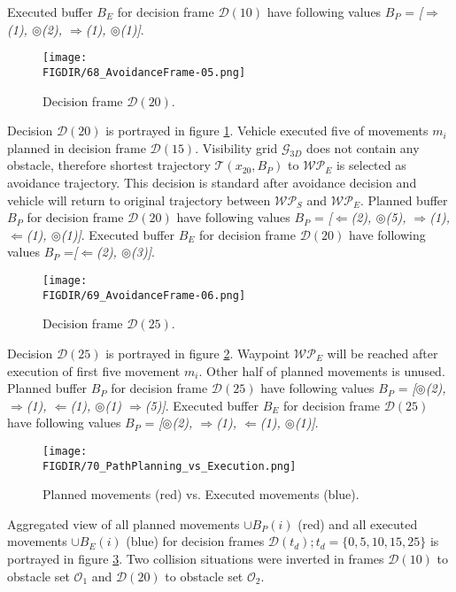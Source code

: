 Executed buffer $B_E$ for decision frame $\mathscr{D}(10)$ have following values $B_P$ = \textit{[$\Rightarrow$(1), $\circledcirc$(2), $\Rightarrow$(1), $\circledcirc$(1)]}.
\begin{figure}[H]
    \centering
    \texttt{[image: \\FIGDIR/68\_AvoidanceFrame-05.png]}
    \caption{Decision frame $\mathscr{D}(20)$.}
    \label{fig:decisionFrameSimple20}
\end{figure}
\noindent Decision $\mathscr{D}(20)$ is portrayed in figure \ref{fig:decisionFrameSimple20}. Vehicle executed five of movements $m_i$ planned in decision frame $\mathscr{D}(15)$. Visibility grid $\mathscr{G}_{3D}$ does not contain any obstacle, therefore shortest trajectory $\mathscr{T}(x_20,B_P)$ to $\mathscr{WP}_E$ is selected as avoidance trajectory. This decision is standard after avoidance decision and vehicle will return to original trajectory between $\mathscr{WP}_S$ and $\mathscr{WP}_E$.
Planned buffer $B_P$ for decision frame $\mathscr{D}(20)$ have following values $B_P$ = \textit{[$\Leftarrow$(2), $\circledcirc$(5), $\Rightarrow$(1), $\Leftarrow$(1), $\circledcirc$(1)]}.
Executed buffer $B_E$ for decision frame $\mathscr{D}(20)$ have following values $B_P$ =\textit{[$\Leftarrow$(2), $\circledcirc$(3)]}.
\begin{figure}[H]
    \centering
    \texttt{[image: \\FIGDIR/69\_AvoidanceFrame-06.png]}
    \caption{Decision frame $\mathscr{D}(25)$.}
    \label{fig:decisionFrameSimple25}
\end{figure}
\noindent Decision $\mathscr{D}(25)$ is portrayed in figure \ref{fig:decisionFrameSimple25}. Waypoint $\mathscr{WP}_E$ will be reached after execution of first five movement $m_i$. Other half of planned movements is unused.
Planned buffer $B_P$ for decision frame $\mathscr{D}(25)$ have following values $B_P$ =  \textit{[$\circledcirc$(2), $\Rightarrow$(1), $\Leftarrow$(1), $\circledcirc$(1) $\Rightarrow$(5)]}.
Executed buffer $B_E$ for decision frame $\mathscr{D}(25)$ have following values $B_P$ = \textit{[$\circledcirc$(2), $\Rightarrow$(1), $\Leftarrow$(1), $\circledcirc$(1)]}.
\begin{figure}[H]
    \centering
    \texttt{[image: \\FIGDIR/70\_PathPlanning\_vs\_Execution.png]}
    \caption{Planned movements (red) vs. Executed movements (blue).}
    \label{fig:planVSExecutionSimple}
\end{figure}
\noindent Aggregated view of all planned movements $\cup B_P(i)$ (red) and all executed movements $\cup B_E(i)$ (blue) for decision frames $\mathscr{D}(t_d);t_d=\{0,5,10,15,25\}$ is portrayed in figure \ref{fig:planVSExecutionSimple}. Two collision situations were inverted in frames $\mathscr{D}(10)$ to obstacle set $\mathscr{O}_1$ and $\mathscr{D}(20)$ to obstacle set $\mathscr{O}_2$.
